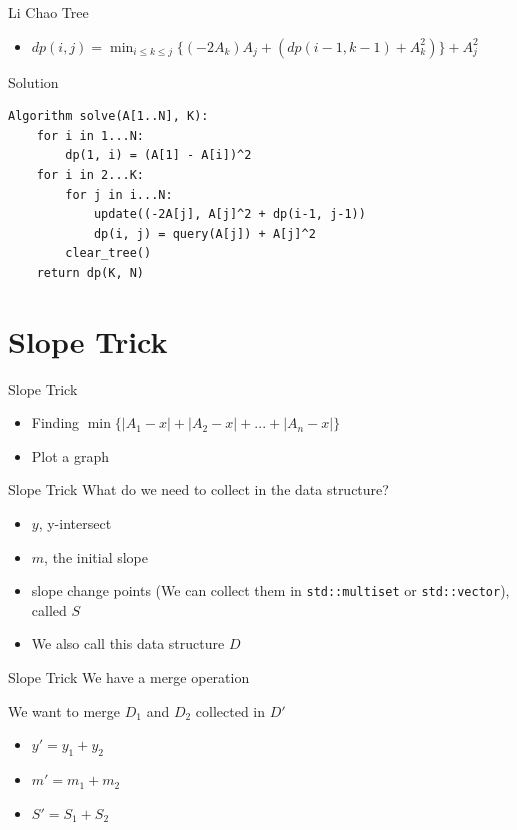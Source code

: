 \documentclass[aspectratio=169,xcolor=dvipsnames]{beamer}
\begin{document}
\begin{frame}{Li Chao Tree}
\probstatement
\begin{itemize}
    \item $dp(i, j) = \displaystyle\min_{i\leq k\leq j}\{(-2A_k)A_j + (dp(i-1, k-1) + A_k^2)\} + A_j^2$
\end{itemize}
\begin{block}{Solution}
\begin{verbatim}
Algorithm solve(A[1..N], K): 
    for i in 1...N:
        dp(1, i) = (A[1] - A[i])^2
    for i in 2...K:
        for j in i...N:
            update((-2A[j], A[j]^2 + dp(i-1, j-1))
            dp(i, j) = query(A[j]) + A[j]^2
        clear_tree()
    return dp(K, N)
\end{verbatim}
\end{block}
\end{frame}



\section{Slope Trick}
\begin{frame}[t, plain]{Slope Trick}
\begin{itemize}
    \item Finding $\min\{|A_1 - x| + |A_2 - x| + ... + |A_n - x|\}$
    \pause
    \item Plot a graph
\end{itemize}
\end{frame}

\begin{frame}[t, plain]{Slope Trick}
What do we need to collect in the data structure?
\pause
\begin{itemize}
    \item $y$, y-intersect
    \pause 
    \item $m$, the initial slope
    \pause
    \item slope change points (We can collect them in \texttt{std::multiset} or \texttt{std::vector}), called $S$
    \pause
    \item We also call this data structure $D$
\end{itemize}
\end{frame}

\begin{frame}[t, plain]{Slope Trick}
We have a merge operation
\pause
\begin{examples}
We want to merge $D_1$ and $D_2$ collected in $D'$
\pause
\begin{itemize}
    \item $y' = y_1 + y_2$
    \pause 
    \item $m' = m_1 + m_2$
    \pause
    \item $S' = S_1 + S_2$
\end{itemize}
\end{examples}
\end{frame}
\end{document}
